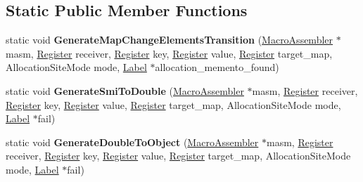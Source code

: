 \subsection*{Static Public Member Functions}
\begin{DoxyCompactItemize}
\item 
static void {\bfseries Generate\+Map\+Change\+Elements\+Transition} (\hyperlink{classv8_1_1internal_1_1_macro_assembler}{Macro\+Assembler} $\ast$masm, \hyperlink{structv8_1_1internal_1_1_register}{Register} receiver, \hyperlink{structv8_1_1internal_1_1_register}{Register} key, \hyperlink{structv8_1_1internal_1_1_register}{Register} value, \hyperlink{structv8_1_1internal_1_1_register}{Register} target\+\_\+map, Allocation\+Site\+Mode mode, \hyperlink{classv8_1_1internal_1_1_label}{Label} $\ast$allocation\+\_\+memento\+\_\+found)\hypertarget{classv8_1_1internal_1_1_elements_transition_generator_a911b2631ec80409c2038f11df1e8a2b5}{}\label{classv8_1_1internal_1_1_elements_transition_generator_a911b2631ec80409c2038f11df1e8a2b5}

\item 
static void {\bfseries Generate\+Smi\+To\+Double} (\hyperlink{classv8_1_1internal_1_1_macro_assembler}{Macro\+Assembler} $\ast$masm, \hyperlink{structv8_1_1internal_1_1_register}{Register} receiver, \hyperlink{structv8_1_1internal_1_1_register}{Register} key, \hyperlink{structv8_1_1internal_1_1_register}{Register} value, \hyperlink{structv8_1_1internal_1_1_register}{Register} target\+\_\+map, Allocation\+Site\+Mode mode, \hyperlink{classv8_1_1internal_1_1_label}{Label} $\ast$fail)\hypertarget{classv8_1_1internal_1_1_elements_transition_generator_a69f00e6bde4e084ccfed2a4905f0bf1d}{}\label{classv8_1_1internal_1_1_elements_transition_generator_a69f00e6bde4e084ccfed2a4905f0bf1d}

\item 
static void {\bfseries Generate\+Double\+To\+Object} (\hyperlink{classv8_1_1internal_1_1_macro_assembler}{Macro\+Assembler} $\ast$masm, \hyperlink{structv8_1_1internal_1_1_register}{Register} receiver, \hyperlink{structv8_1_1internal_1_1_register}{Register} key, \hyperlink{structv8_1_1internal_1_1_register}{Register} value, \hyperlink{structv8_1_1internal_1_1_register}{Register} target\+\_\+map, Allocation\+Site\+Mode mode, \hyperlink{classv8_1_1internal_1_1_label}{Label} $\ast$fail)\hypertarget{classv8_1_1internal_1_1_elements_transition_generator_aa9fe2794bc101acf06608aa26109615a}{}\label{classv8_1_1internal_1_1_elements_transition_generator_aa9fe2794bc101acf06608aa26109615a}

\end{DoxyCompactItemize}
